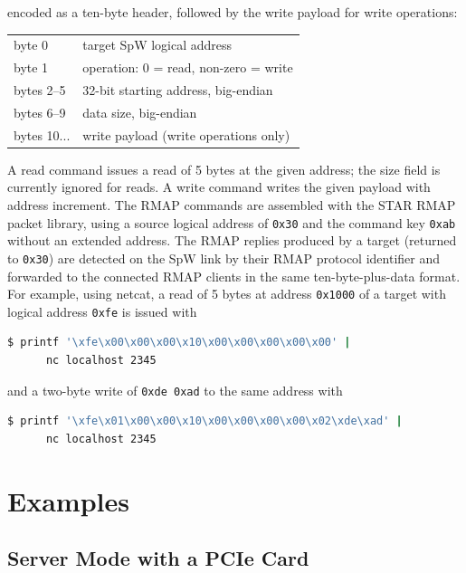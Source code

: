 \noindent
encoded as a ten-byte header, followed by the write payload for write
operations:

\noindent
\begin{tabu} to 
	byte 0		& target \gls{SpW} logical address \\
	byte 1		& operation: 0 = read, non-zero = write \\
	bytes 2--5	& 32-bit starting address, big-endian \\
	bytes 6--9	& data size, big-endian \\
	bytes 10...	& write payload (write operations only) \\
\end{tabu}

\noindent
A read command issues a read of 5 bytes at the given address; the size field
is currently ignored for reads. A write command writes the given payload with
address increment. The RMAP commands are assembled with the STAR RMAP packet
library, using a source logical address of \texttt{0x30} and the command key
\texttt{0xab} without an extended address. The RMAP replies produced by a
target (returned to \texttt{0x30}) are detected on the \gls{SpW} link by their
RMAP protocol identifier and forwarded to the connected RMAP clients in the
same ten-byte-plus-data format.
\\

For example, using netcat, a read of 5 bytes at address \texttt{0x1000} of a
target with logical address \texttt{0xfe} is issued with

\begin{lstlisting}[language=bash]
  $ printf '\xfe\x00\x00\x00\x10\x00\x00\x00\x00\x00' |
      nc localhost 2345
\end{lstlisting}

\noindent
and a two-byte write of \texttt{0xde 0xad} to the same address with

\begin{lstlisting}[language=bash]
  $ printf '\xfe\x01\x00\x00\x10\x00\x00\x00\x00\x02\xde\xad' |
      nc localhost 2345
\end{lstlisting}

\section{Examples}

\subsection{Server Mode with a PCIe Card}

